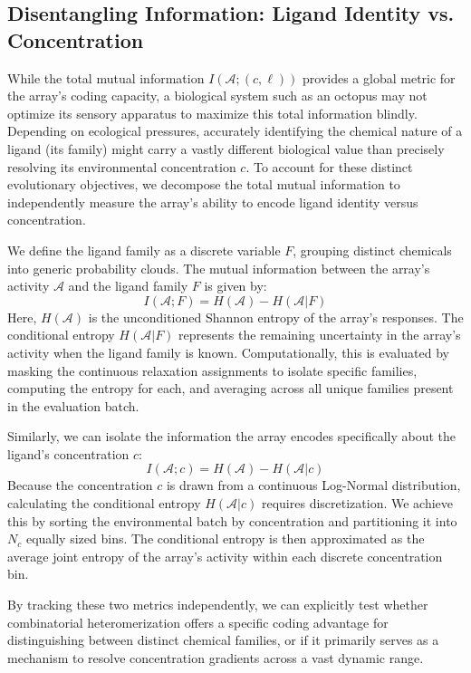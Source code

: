 \documentclass[
    reprint, %
    amsmath,
    amssymb,
    aps,
    prb,      %
    floatfix
]{revtex4-2}
\begin{document}
\subsection{Disentangling Information: Ligand Identity vs. Concentration}

While the total mutual information $I(\mathcal{A};(c,\ell))$ provides a global metric for the array's coding capacity, a biological system such as an octopus may not optimize its sensory apparatus to maximize this total information blindly. Depending on ecological pressures, accurately identifying the chemical nature of a ligand (its family) might carry a vastly different biological value than precisely resolving its environmental concentration $c$. To account for these distinct evolutionary objectives, we decompose the total mutual information to independently measure the array's ability to encode ligand identity versus concentration. 


We define the ligand family as a discrete variable $F$, grouping distinct chemicals into generic probability clouds. The mutual information between the array's activity $\mathcal{A}$ and the ligand family $F$ is given by:
\begin{equation}
I(\mathcal{A}; F) = H(\mathcal{A}) - H(\mathcal{A} | F)
\end{equation}
Here, $H(\mathcal{A})$ is the unconditioned Shannon entropy of the array's responses. The conditional entropy $H(\mathcal{A} | F)$ represents the remaining uncertainty in the array's activity when the ligand family is known. Computationally, this is evaluated by masking the continuous relaxation assignments to isolate specific families, computing the entropy for each, and averaging across all unique families present in the evaluation batch. 

Similarly, we can isolate the information the array encodes specifically about the ligand's concentration $c$:
\begin{equation}I(\mathcal{A}; c) = H(\mathcal{A}) - H(\mathcal{A} | c)\end{equation}
Because the concentration $c$ is drawn from a continuous Log-Normal distribution, calculating the conditional entropy $H(\mathcal{A} | c)$ requires discretization. We achieve this by sorting the environmental batch by concentration and partitioning it into $N_c$ equally sized bins. The conditional entropy is then approximated as the average joint entropy of the array's activity within each discrete concentration bin. 

By tracking these two metrics independently, we can explicitly test whether combinatorial heteromerization offers a specific coding advantage for distinguishing between distinct chemical families, or if it primarily serves as a mechanism to resolve concentration gradients across a vast dynamic range.
\end{document}

